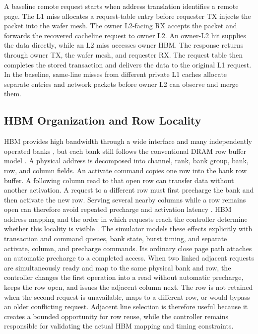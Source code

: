 A baseline remote request starts when address translation identifies a remote
page. The L1 miss allocates a request-table entry before requester TX injects
the packet into the wafer mesh. The owner L2-facing RX accepts the packet and
forwards the recovered cacheline request to owner L2. An owner-L2 hit supplies
the data directly, while an L2 miss accesses owner HBM. The response returns
through owner TX, the wafer mesh, and requester RX. The request table then
completes the stored transaction and delivers the data to the original L1
request. In the baseline, same-line misses from different private L1 caches
allocate separate entries and network packets before owner L2 can observe and
merge them.

\subsection{HBM Organization and Row Locality}
\label{sec:background-hbm}

HBM provides high bandwidth through a wide interface and many independently
operated banks \cite{li2016exploring,wang2022shuhai,micron_hbm2e}, but each
bank still follows the conventional DRAM row buffer model
\cite{rixner2000memory,ding2013reshaping}.  A physical address is decomposed
into channel, rank, bank group, bank,
row, and column fields.  An activate command copies one row into the bank row
buffer.  A following column read to that open row can transfer data without
another activation.  A request to a different row must first precharge the
bank and then activate the new row.  Serving several nearby columns while a row
remains open can therefore avoid repeated precharge and activation latency
\cite{rixner2000memory}.  HBM address mapping and the order in which requests
reach the controller determine whether this locality is visible
\cite{li2016exploring,wang2022shuhai,wang2019mac}.  The simulator models these
effects explicitly with transaction and command queues, bank state, burst
timing, and separate activate, column, and precharge commands.  Its ordinary
close page path attaches an automatic precharge to a completed access.  When
two linked adjacent requests are simultaneously ready and map to the same
physical bank and row, the controller changes the first operation into a read
without automatic precharge, keeps the row open, and issues the adjacent column
next.  The row is not retained when the second request is unavailable, maps to
a different row, or would bypass an older conflicting request.  Adjacent line
selection is therefore useful because it creates a bounded opportunity for
row reuse, while the controller remains responsible for validating the actual
HBM mapping and timing constraints.

